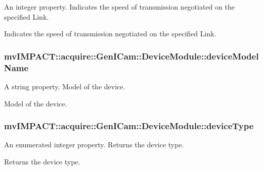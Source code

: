 An integer property. Indicates the speed of transmission negotiated on the specified Link. 

Indicates the speed of transmission negotiated on the specified Link. \hypertarget{classmv_i_m_p_a_c_t_1_1acquire_1_1_gen_i_cam_1_1_device_module_a69198a07064e23d20df49a09471d5634}{
\subsubsection[{device\+Model\+Name}]{ mv\+I\+M\+P\+A\+C\+T\+::acquire\+::\+Gen\+I\+Cam\+::\+Device\+Module\+::device\+Model\+Name}}\label{classmv_i_m_p_a_c_t_1_1acquire_1_1_gen_i_cam_1_1_device_module_a69198a07064e23d20df49a09471d5634}


A string property. Model of the device. 

Model of the device. \hypertarget{classmv_i_m_p_a_c_t_1_1acquire_1_1_gen_i_cam_1_1_device_module_a6b240ba418a9d63a872da61b7b718fb5}{
\subsubsection[{device\+Type}]{ mv\+I\+M\+P\+A\+C\+T\+::acquire\+::\+Gen\+I\+Cam\+::\+Device\+Module\+::device\+Type}}\label{classmv_i_m_p_a_c_t_1_1acquire_1_1_gen_i_cam_1_1_device_module_a6b240ba418a9d63a872da61b7b718fb5}


An enumerated integer property. Returns the device type. 

Returns the device type.

